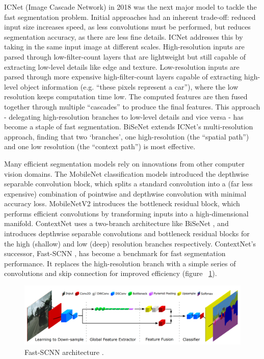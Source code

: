 \documentclass[a4paper,12pt]{report}
\begin{document}
ICNet (Image Cascade Network) \cite{zhao_icnet_2018} in 2018 was the next major model to tackle the fast segmentation problem. Initial approaches had an inherent trade-off: reduced input size increases speed, as less convolutions must be performed, but reduces segmentation accuracy, as there are less fine details. ICNet addresses this by taking in the same input image at different scales. High-resolution inputs are parsed through low-filter-count layers that are lightweight but still capable of extracting low-level details like edge and texture. Low-resolution inputs are parsed through more expensive high-filter-count layers capable of extracting high-level object information (e.g. “these pixels represent a car”), where the low resolution keeps computation time low. The computed features are then fused together through multiple “cascades” to produce the final features. This approach - delegating high-resolution branches to low-level details and vice versa - has become a staple of fast segmentation. BiSeNet \cite{yu_bisenet_2018} extends ICNet’s multi-resolution approach, finding that two ‘branches’, one high-resolution (the “spatial path”) and one low resolution (the “context path”) is most effective.

Many efficient segmentation models rely on innovations from other computer vision domains. The MobileNet \cite{howard_mobilenets_2017} classification models introduced the depthwise separable convolution block, which splits a standard convolution into a (far less expensive) combination of pointwise and depthwise convolution with minimal accuracy loss. MobileNetV2 \cite{sandler_mobilenetv2_2019} introduces the bottleneck residual block, which performs efficient convolutions by transforming inputs into a high-dimensional manifold. ContextNet \cite{poudel_contextnet_2018} uses a two-branch architecture like BiSeNet \cite{yu_bisenet_2018}, and introduces depthwise separable convolutions and bottleneck residual blocks for the high (shallow) and low (deep) resolution branches respectively. ContextNet’s successor, Fast-SCNN \cite{poudel_fast-scnn_2019}, has become a benchmark for fast segmentation performance. It replaces the high-resolution branch with a simple series of convolutions and skip connection for improved efficiency (figure ~\ref{fig:fastscnn_architecture}).

\begin{figure}[h]
    \centering
    \includegraphics[width=\textwidth]{res/fastscnn-architecture.png}
    \caption{Fast-SCNN architecture \cite{poudel_fast-scnn_2019}.}
    \label{fig:fastscnn_architecture}
\end{figure}
\end{document}
